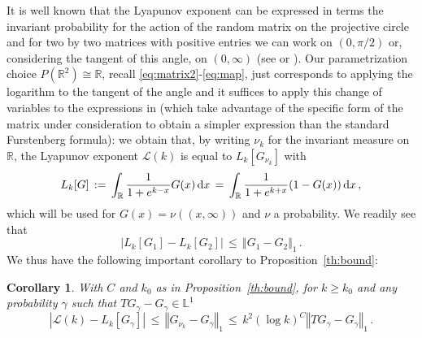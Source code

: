 \documentclass[reqno,11pt]{amsart}
\numberwithin{equation}{section}
\newtheorem{cor}[theorem]{Corollary}
\newcommand{\cL}{{\ensuremath{\mathcal L}} }
\newcommand{\dd}{\,\text{\rm d}}             %
\newcommand{\bbL}{{\ensuremath{\mathbb L}} }
\newcommand{\bbR}{{\ensuremath{\mathbb R}} }
\begin{document}
\medskip

It is well known that the Lyapunov exponent  can be  expressed in terms the invariant probability for the action of the random matrix on the projective circle 
\cite[Ch.~2]{cf:BL} and  for two by two  matrices with positive entries we can work on $(0, \pi/2)$ or, considering the tangent of this angle, 
on $(0, \infty)$ 
(see \cite[(1.6)]{cf:GGG} or \cite[Sec.~2]{cf:DH}). Our parametrization choice  $P(\bbR^2)\cong \bbR$, recall \eqref{eq:matrix2}-\eqref{eq:map}, just corresponds to applying the logarithm to the tangent of the angle and it suffices to apply this change of variables to the expressions in  
\cite{cf:DH,cf:GGG} (which take advantage of the specific form of the matrix under consideration to obtain a simpler expression than the standard Furstenberg formula): we obtain that,
by writing $\nu_k$ for the invariant measure on $\bbR$, the Lyapunov exponent $\cL(k)$ is equal to $L_k[G_{\nu_k}]$ with
\begin{equation}
\label{eq:L_k}
L_k[G]\,:=\, \int_ \bbR \frac{1} {1+e^{k-x}} G(x) \dd x\, =\,  \int_ \bbR \frac{1} {1+e^{k+x}} (1-G(x)) \dd x\,,
\end{equation}
which will be used for 
 $G(x)= \nu((x, \infty))$ and $\nu$ a probability.  
We readily see that 
\begin{equation}
\label{eq:Ly}
\left \vert L_k[G_1] - L_k[G_2 ]\right \vert \, \le \, \Vert G_1 -G_2 \Vert_1\, . 
\end{equation}
We thus have the following important corollary to Proposition~\ref{th:bound}:
\medskip

\begin{cor}
\label{th:bound-cor}
With $C$ and $k_0$ as in Proposition~\ref{th:bound},
for $k \ge k_0$ and any  probability $\gamma $ such that $T G_\gamma - G_\gamma \in \bbL^1$
\begin{equation} 
\label{eq:bound-cor}
\left \vert \cL(k)- L_k[G_\gamma] \right \vert \, \le\, \left \Vert G_{\nu_k} - G _ \gamma \right \Vert _1\, \le  \, k^2 \left( \log k \right)^C \left \Vert T G_\gamma - G_\gamma \right\Vert_1\, .
\end{equation}
\end{cor}

\medskip
\end{document}
